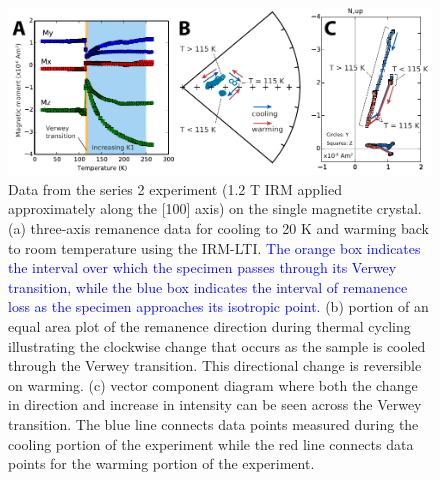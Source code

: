 \documentclass[draft,gc]{AGUTeX}
\begin{document}
\begin{figure}
\noindent\includegraphics[width=\textwidth]{Magnetite2.pdf}
\caption{Data from the series 2 experiment (1.2 T IRM applied approximately along the [100] axis) on the single magnetite crystal. (a) three-axis remanence data for cooling to 20 K and warming back to room temperature using the IRM-LTI. \textcolor{blue}{The orange box indicates the interval over which the specimen passes through its Verwey transition, while the blue box indicates the interval of remanence loss as the specimen approaches its isotropic point. }(b) portion of an equal area plot of the remanence direction during thermal cycling illustrating the clockwise change that occurs as the sample is cooled through the Verwey transition. This directional change is reversible on warming. (c) vector component diagram where both the change in direction and increase in intensity can be seen across the Verwey transition. The blue line connects data points measured during the cooling portion of the experiment while the red line connects data points for the warming portion of the experiment.
}
\label{fig:magnetite2}
\end{figure}
\end{document}
